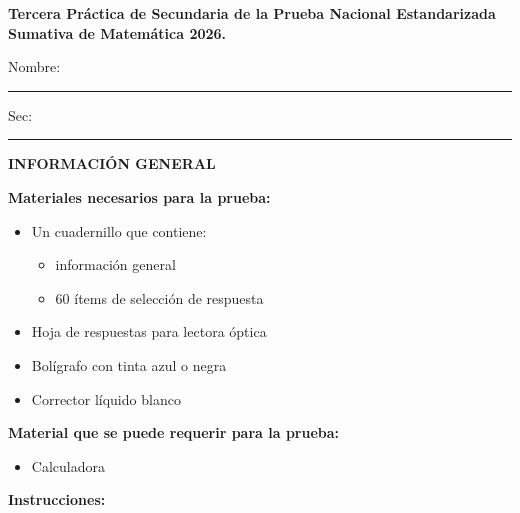 \documentclass[12pt]{article}
\begin{document}
\begin{center}
{\large \textbf{Tercera Pr\'actica de Secundaria de la Prueba Nacional Estandarizada Sumativa de Matem\'atica 2026.}}
\end{center}

\noindent Nombre: \rule{8cm}{0.4pt}\hfill Sec: \rule{3cm}{0.4pt}

\vspace{6pt}
\noindent\textbf{INFORMACI\'ON GENERAL}

\vspace{4pt}
\noindent\textbf{Materiales necesarios para la prueba:}

\begin{itemize}[leftmargin=1.6em, itemsep=1pt, topsep=2pt, parsep=0pt]
  \item Un cuadernillo que contiene:
  \begin{itemize}[leftmargin=1.6em, itemsep=0pt, topsep=1pt, parsep=0pt, label=$\blacklozenge$]
    \item informaci\'on general
    \item 60 \'items de selecci\'on de respuesta
  \end{itemize}
  \item Hoja de respuestas para lectora \'optica
  \item Bol\'igrafo con tinta azul o negra
  \item Corrector l\'iquido blanco
\end{itemize}

\noindent\textbf{Material que se puede requerir para la prueba:}

\begin{itemize}[leftmargin=1.6em, itemsep=1pt, topsep=2pt, parsep=0pt]
  \item Calculadora
\end{itemize}

\vspace{4pt}
\noindent\textbf{Instrucciones:}
\end{document}
